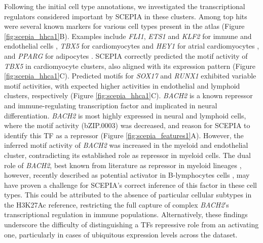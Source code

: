 Following the initial cell type annotations, we investigated the transcriptional regulators considered important by SCEPIA in these clusters. Among top hits were several known markers for various cell types present in the atlas (Figure \ref{fig:scepia_hhca1}B). Examples include \textit{FLI1}, \textit{ETS1} and \textit{KLF2} for immune and endothelial cells \cite{Meadows2009,Zhao2018,BenDavid2022}, \textit{TBX5} for cardiomyocytes\cite{Steimle2017,Siatra2023} and \textit{HEY1} for atrial cardiomyocytes \cite{Kokubo2007}, and \textit{PPARG} for adipocytes \cite{Ma2018}. SCEPIA correctly predicted the motif activity of \textit{TBX5} in cardiomyocyte clusters, also aligned with its expression pattern (Figure \ref{fig:scepia_hhca1}C). Predicted motifs for \textit{SOX17} and \textit{RUNX1} exhibited variable motif activities, with expected higher activities in endothelial and lymphoid clusters, respectively \cite{Lee2014,Schachterle2017,Sood2017}(Figure \ref{fig:scepia_hhca1}C). \textit{BACH2} is a known repressor and immune-regulating transcription factor and implicated in neural differentiation\cite{Hoshino2002,Liu2022}. \textit{BACH2} is most highly expressed in neural and lymphoid cells, where the motif activity (bZIP.0003) was decreased, and reason for SCEPIA to identify this TF as a repressor (Figure \ref{fig:scepia_features1}A). However, the inferred motif activity of \textit{BACH2} was increased in the myeloid and endothelial cluster, contradicting its established role as repressor in myeloid cells. The dual role of \textit{BACH2}, best known from literature as repressor in myeloid lineages \cite{ItohNakadai2014}, however, recently described as potential activator in B-lymphocytes cells \cite{Ochiai2022,Ochiai2022}, may have proven a challenge for SCEPIA's correct inference of this factor in these cell types. This could be attributed to the absence of particular cellular subtypes in the H3K27Ac reference, restricting the full capture of complex \textit{BACH2}'s transcriptional regulation in immune populations. Alternatively, these findings underscore the difficulty of distinguishing a TFs repressive role from an activating one, particularly in cases of ubiquitous expression levels across the dataset.
